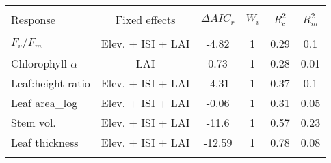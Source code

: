 
\begin{table}[!htbp] \centering 
  \caption{} 
  \label{best_mod_multi_output} 
\begin{tabular}{@{\extracolsep{5pt}} lcS[table-format=3.2]S[table-format=3.2]S[table-format=3.2]S[table-format=3.2]} 
\\[-1.8ex]\hline 
\hline \\[-1.8ex] 
{Response} & {Fixed effects} & {$\Delta{}AIC_r$} & {$W_i$} & {$R^2_c$} & {$R^2_m$} \\
\hline \\[-1.8ex] 
$F_v/F_m$ & Elev. + ISI + LAI & -4.82 & 1 & 0.29 & 0.1 \\ 
Chlorophyll-$\alpha$ & LAI & 0.73 & 1 & 0.28 & 0.01 \\ 
Leaf:height ratio & Elev. + ISI + LAI & -4.31 & 1 & 0.37 & 0.1 \\ 
Leaf area\_log & Elev. + ISI + LAI & -0.06 & 1 & 0.31 & 0.05 \\ 
Stem vol. & Elev. + ISI + LAI & -11.6 & 1 & 0.57 & 0.23 \\ 
Leaf thickness & Elev. + ISI + LAI & -12.59 & 1 & 0.78 & 0.08 \\ 
\hline \\[-1.8ex] 
\end{tabular} 
\end{table} 
